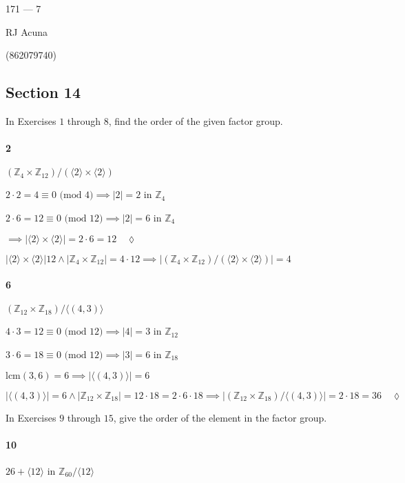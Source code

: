 \documentclass{article}
\newcommand\Z{\mathbb{Z}}
\begin{document}
\begin{center}
  171 --- 7

  RJ Acuna

  (862079740)
\end{center}\vspace{1.618em}


\subsection*{Section 14}

In Exercises $1$ through $8$, find the order of the given factor
group.

\paragraph{2} $(\Z_4\times \Z_{12})/(\langle 2 \rangle\times \langle 2  \rangle)$


$2\cdot 2 = 4 \equiv 0 \text{ (mod $4$)} \implies |2| = 2$ in $\Z_4$

$2\cdot 6 = 12 \equiv 0 \text{ (mod $12$)} \implies |2| = 6$ in $\Z_4$

$\implies |\langle 2 \rangle\times \langle 2  \rangle| = 2\cdot 6 =
12 \quad \lozenge$

$|\langle 2 \rangle\times \langle 2  \rangle|
12 \land |\Z_4\times \Z_{12}| = 4\cdot 12 \implies |(\Z_4\times
\Z_{12})/(\langle 2 \rangle\times \langle 2  \rangle)| = 4$

\paragraph{6} $(\Z_{12}\times \Z_{18})/\langle (4,3) \rangle$

$4\cdot 3 = 12 \equiv 0 \text{ (mod $12$)} \implies |4| = 3$ in $\Z_{12}$

$3\cdot 6 = 18 \equiv 0 \text{ (mod $12$)} \implies |3| = 6$ in $\Z_{18}$

$\text{lcm}(3,6) = 6 \implies |\langle (4,3) \rangle| =  6$

$|\langle (4,3) \rangle| = 6 \land |\Z_{12}\times \Z_{18}| = 12\cdot
18 = 2\cdot 6\cdot 18 \implies |(\Z_{12}\times \Z_{18})/\langle (4,3)
\rangle| = 2\cdot 18 = 36 \quad \lozenge$

\vspace{1em}

In Exercises $9$ through $15$, give the order of the element in the
factor group.
\paragraph{10} $26 + \langle 12 \rangle$ in $\Z_{60}/\langle 12
\rangle$
\end{document}
